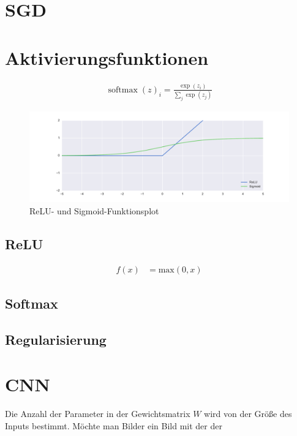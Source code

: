 \section{SGD}

\section{Aktivierungsfunktionen}
\begin{align}
    \operatorname{softmax}(z)_{i}=\frac{\exp\left(z_{i}\right)}{ \sum _ { j } \exp \left( z _ { j } \right) }
\end{align}
\begin{figure}
    \caption{ReLU- und Sigmoid-Funktionsplot}
    \includegraphics[width=\textwidth]{figures/plot/relu_sigmoid.pdf}
\end{figure}

\subsection{ReLU}
\begin{align}
    f\left(x\right) &= \text{max}(0,x)
\end{align}
\subsection{Softmax}

\subsection{Regularisierung}
\label{sec:Regularisierung}

\section{CNN}
Die Anzahl der Parameter in der Gewichtsmatrix \(W\) wird von der Größe des Inputs bestimmt.
Möchte man Bilder ein Bild mit der der 

